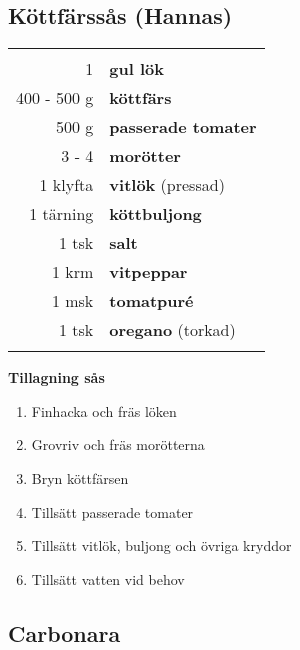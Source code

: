 \clearpage

\subsection{Köttfärssås (Hannas)}

\begin{table}[H]
	\begin{tabular}{rl}
	\hline
	&\\
		1 & \textbf{gul lök} \\
		400 - 500 g & \textbf{köttfärs}\\
		500 g & \textbf{passerade tomater}\\
		3 - 4 & \textbf{morötter}\\
		1 klyfta & \textbf{vitlök} (pressad)\\
		1 tärning & \textbf{köttbuljong}\\
		1 tsk & \textbf{salt}\\
		1 krm & \textbf{vitpeppar}\\
		1 msk & \textbf{tomatpuré}\\
		1 tsk & \textbf{oregano} (torkad) \\
	&\\
	\hline
	\end{tabular}
\end{table}


\begin{multicols*}{2}

\noindent \textbf{Tillagning sås}
\begin{enumerate}
	\itemsep0cm
	\item Finhacka och fräs löken
	\item Grovriv och fräs morötterna
	\item Bryn köttfärsen
	\item Tillsätt passerade tomater
	\item Tillsätt vitlök, buljong och övriga kryddor
	\item Tillsätt vatten vid behov
\end{enumerate}

\end{multicols*}

\clearpage

\subsection{Carbonara}

